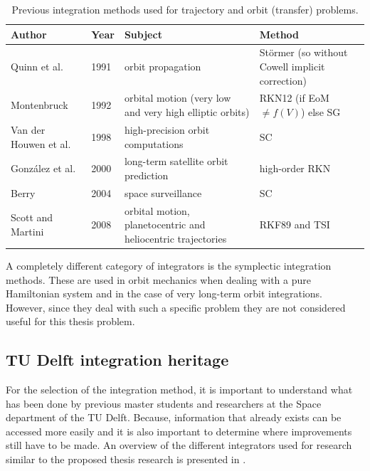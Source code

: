 \begin{table}[!ht]
\begin{center}
\caption{Previous integration methods used for trajectory and orbit (transfer) problems.}
\label{tab:intprevmeth}
\begin{tabular}{|l|l|p{5cm}|p{5cm}|}
\hline 
\textbf{Author} & \textbf{Year}		& \textbf{Subject} & \textbf{Method} \\ \hline \hline
Quinn et al. 	\cite{quinn1991} & 1991	& orbit propagation & St\"{o}rmer (so without Cowell implicit correction)  \\ \hline
Montenbruck \cite{montenbruck1992} & 1992 		& orbital motion (very low and very high elliptic orbits) & \ac{RKN12} (if \acs{EoM} $\neq f(V)$) else \ac{SG}  \\ \hline
Van der Houwen et al. 		\cite{houwen1998} & 1998 & high-precision orbit computations &  SC  \\ \hline
Gonz\'{a}lez et al. \cite{gonzalez2000} & 2000 & long-term satellite orbit prediction &  high-order RKN \\ \hline
Berry \cite{berry2004} &	2004	& space surveillance &  SC \\ \hline
Scott and Martini \cite{scott2008high} & 2008 & orbital motion, planetocentric and heliocentric trajectories & RKF89 and \ac{TSI}   \\ \hline
 		
\end{tabular}
\end{center}
\end{table}




A completely different category of integrators is the symplectic integration methods. These are used in orbit mechanics when dealing with a pure Hamiltonian system \cite{hofsteenge2013} and in the case of very long-term orbit integrations. However, since they deal with such a specific problem they are not considered useful for this thesis problem. %

\subsection{TU Delft integration heritage}
\label{subsec:inther}
For the selection of the integration method, it is important to understand what has been done by previous master students and researchers at the Space department of the TU Delft. Because, information that already exists can be accessed more easily and it is also important to determine where improvements still have to be made. An overview of the different integrators used for research similar to the proposed thesis research is presented in .


